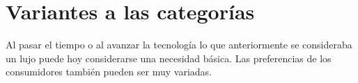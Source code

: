 \documentclass{article}
\begin{document}
\section*{Variantes a las categorías}
Al pasar el tiempo o al avanzar la tecnología lo que anteriormente se consideraba un lujo puede hoy considerarse una necesidad básica. Las preferencias de los consumidores también pueden ser muy variadas. 


 


\end{document}
